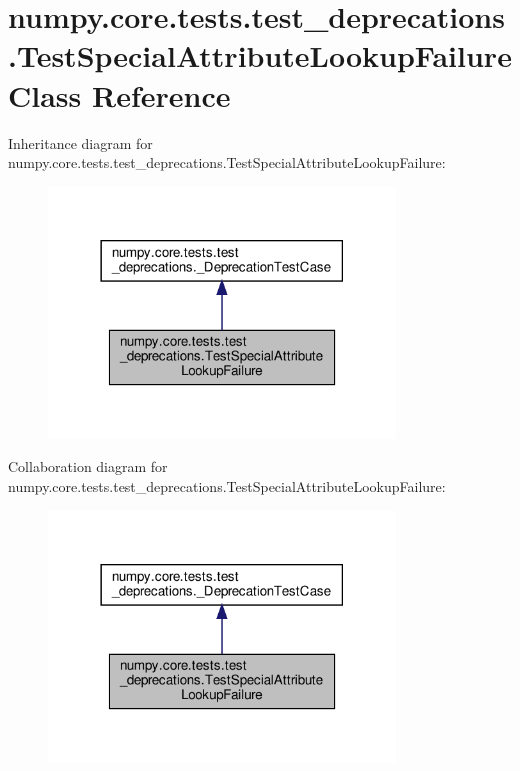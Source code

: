 \hypertarget{classnumpy_1_1core_1_1tests_1_1test__deprecations_1_1TestSpecialAttributeLookupFailure}{}\section{numpy.\+core.\+tests.\+test\+\_\+deprecations.\+Test\+Special\+Attribute\+Lookup\+Failure Class Reference}
\label{classnumpy_1_1core_1_1tests_1_1test__deprecations_1_1TestSpecialAttributeLookupFailure}


Inheritance diagram for numpy.\+core.\+tests.\+test\+\_\+deprecations.\+Test\+Special\+Attribute\+Lookup\+Failure\+:
\nopagebreak
\begin{figure}[H]
\begin{center}
\leavevmode
\includegraphics[width=261pt]{classnumpy_1_1core_1_1tests_1_1test__deprecations_1_1TestSpecialAttributeLookupFailure__inherit__graph}
\end{center}
\end{figure}


Collaboration diagram for numpy.\+core.\+tests.\+test\+\_\+deprecations.\+Test\+Special\+Attribute\+Lookup\+Failure\+:
\nopagebreak
\begin{figure}[H]
\begin{center}
\leavevmode
\includegraphics[width=261pt]{classnumpy_1_1core_1_1tests_1_1test__deprecations_1_1TestSpecialAttributeLookupFailure__coll__graph}
\end{center}
\end{figure}
